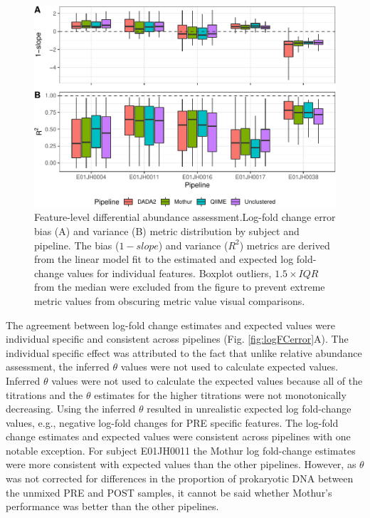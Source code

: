 \documentclass{bmcart}
\begin{document}
\begin{figure}
\centering
\includegraphics{logFcErrorMetrics-1.pdf}
\caption{\label{fig:logFcErrorMetrics}Feature-level differential abundance assessment.Log-fold change error
bias (A) and variance (B) metric distribution by subject and pipeline.
The bias (\(1 - slope\)) and variance (\(R^2\)) metrics are derived from
the linear model fit to the estimated and expected log fold-change
values for individual features. Boxplot outliers, \(1.5\times IQR\) from
the median were excluded from the figure to prevent extreme metric
values from obscuring metric value visual comparisons.}
\end{figure}

The agreement between log-fold change estimates and expected values were
individual specific and consistent across pipelines (Fig.
\ref{fig:logFCerror}A). The individual specific effect was attributed to
the fact that unlike relative abundance assessment, the inferred
\(\theta\) values were not used to calculate expected values. Inferred
\(\theta\) values were not used to calculate the expected values because
all of the titrations and the \(\theta\) estimates for the higher
titrations were not monotonically decreasing.
Using the inferred \(\theta\) resulted in unrealistic expected log fold-change values, e.g.,
negative log-fold changes for PRE specific features. The log-fold change
estimates and expected values were consistent across pipelines with one
notable exception. For subject E01JH0011 the Mothur log fold-change estimates
were more consistent with expected values than the other pipelines.
However, as \(\theta\) was not corrected for differences in the
proportion of prokaryotic DNA between the unmixed PRE and POST samples,
it cannot be said whether Mothur's performance was better than the other
pipelines.
\end{document}
